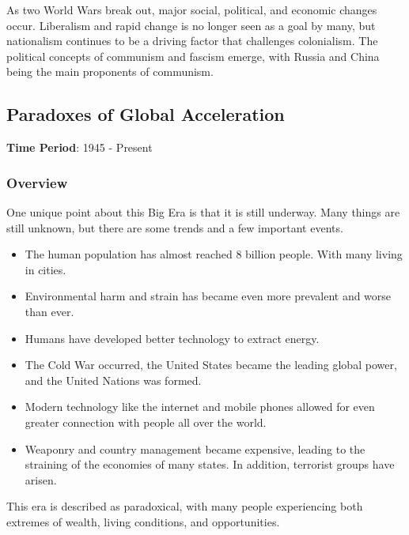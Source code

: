 \documentclass[11pt]{article}
\begin{document}
As two World Wars break out, major social, political, and economic changes occur. Liberalism and rapid change is no longer seen as a goal by many, but nationalism continues to be a driving factor that challenges colonialism. The political concepts of communism and fascism emerge, with Russia and China being the main proponents of communism.
\subsection{Paradoxes of Global Acceleration}
\label{sec:orgde1ad74}

\textbf{Time Period}: 1945 - Present

\subsubsection{Overview}
\label{sec:org46977c4}

One unique point about this Big Era is that it is still underway. Many things are still unknown, but there are some trends and a few important events.

\begin{itemize}
\item The human population has almost reached 8 billion people. With many living in cities.
\item Environmental harm and strain has became even more prevalent and worse than ever.
\item Humans have developed better technology to extract energy.
\item The Cold War occurred, the United States became the leading global power, and the United Nations was formed.
\item Modern technology like the internet and mobile phones allowed for even greater connection with people all over the world.
\item Weaponry and country management became expensive, leading to the straining of the economies of many states. In addition, terrorist groups have arisen.
\end{itemize}

This era is described as paradoxical, with many people experiencing both extremes of wealth, living conditions, and opportunities.
\end{document}

